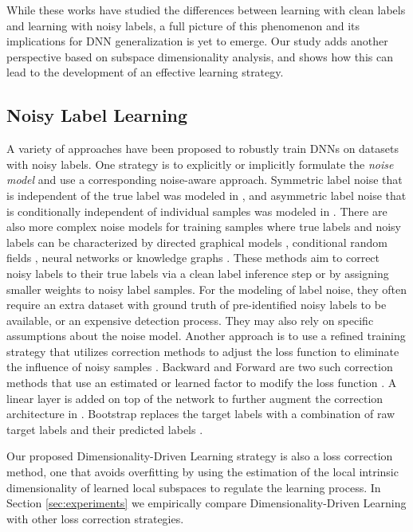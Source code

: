 \documentclass{article}
\begin{document}
While these works have studied the differences between learning with clean labels and learning with noisy labels, a full picture of this phenomenon and its implications for DNN generalization is yet to emerge.   Our study adds another perspective based on subspace dimensionality analysis, and shows how this can lead to the development of an effective learning strategy.   

\subsection{Noisy Label Learning}
A variety of approaches have been proposed to robustly train DNNs on datasets with noisy labels. One strategy is to explicitly or implicitly formulate the {\em noise model} and use a corresponding noise-aware approach. Symmetric label noise that is independent of the true label was modeled in \cite{larsen1998design}, and asymmetric label noise that is conditionally independent of individual samples was modeled in \cite{natarajan2013learning,sukhbaatar2014training}. There are also more complex noise models for training samples where true labels and noisy labels can be characterized by directed graphical models \cite{xiao2015learning}, conditional random fields \cite{vahdat2017toward}, neural networks \cite{veit2017learning,jiang2017mentornet} or knowledge graphs \cite{li2017learning}. These methods aim to correct noisy labels to their true labels via a clean label inference step or by assigning smaller weights to noisy label samples. For the modeling of label noise, they often require an extra dataset with ground truth of pre-identified noisy labels to be available, or an expensive detection process. They may also rely on specific assumptions about the noise model. %
Another approach is to use a refined training strategy that utilizes correction methods to adjust the loss function to eliminate the influence of noisy samples \citep{Wang_2018_CVPR}. Backward and Forward are two such correction methods that use an estimated or learned factor to modify the loss function \cite{patrini2017making}. A linear layer is added on top of the network to further augment the correction architecture in \cite{sukhbaatar2014learning,goldberger2016training}.  Bootstrap replaces the target labels with a combination of raw target labels and their predicted labels \cite{reed2014training}. 

Our proposed Dimensionality-Driven Learning strategy is also a loss correction method, one that avoids overfitting by using the estimation of the local intrinsic dimensionality of learned local subspaces to regulate the learning process. 
In Section \ref{sec:experiments} we empirically compare Dimensionality-Driven Learning with other loss correction strategies.
\end{document}
